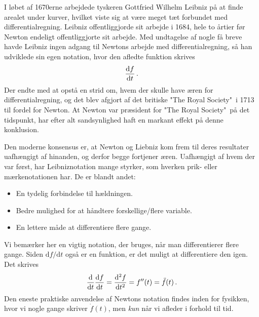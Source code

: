 I løbet af 1670erne arbejdede tyskeren Gottfried Wilhelm Leibniz på at finde arealet under kurver, hvilket viste sig at være meget tæt forbundet med differentialregning. Leibniz offentliggjorde sit arbejde i 1684, hele to årtier før Newton endeligt offentliggjorte sit arbejde. 
Med undtagelse af nogle få breve havde Leibniz ingen adgang til Newtons arbejde med differentialregning, så han udviklede sin egen notation, hvor den afledte funktion skrives
$$
\dv{f}{t} \, .
$$
Der endte med at opstå en strid om, hvem der skulle have æren for differentialregning, og det blev afgjort af det britiske "The Royal Society"$\,$ i 1713 til fordel for Newton. At Newton var præsident for "The Royal Society"$\,$ på det tidspunkt, har efter alt sandsynlighed haft en markant effekt på denne konklusion.

Den moderne konsensus er, at Newton og Liebniz kom frem til deres resultater uafhængigt af hinanden, og derfor begge fortjener æren. Uafhængigt af hvem der var først, har Leibniznotation mange styrker, som hverken prik- eller mærkenotationen har. De er blandt andet: 
\begin{itemize}
    \item En tydelig forbindelse til hældningen.
    \item Bedre mulighed for at håndtere forskellige/flere variable.
    \item En lettere måde at differentiere flere gange.
\end{itemize}
Vi bemærker her en vigtig notation, der bruges, når man differentierer flere gange. Siden $\text{d}f / \text{d}t$ også er en funktion, er det muligt at differentiere den igen. Det skrives
\begin{equation}
    \dv{}{t}\dv{f}{t}(t)=\dv[2]{f}{t}=f''(t)=\Ddot{f}(t)\, .
\end{equation}
Den eneste praktiske anvendelse af Newtons notation findes inden for fysikken, hvor vi nogle gange skriver $\dot{f}(t)$, men \emph{kun} når vi afleder i forhold til tid. 

